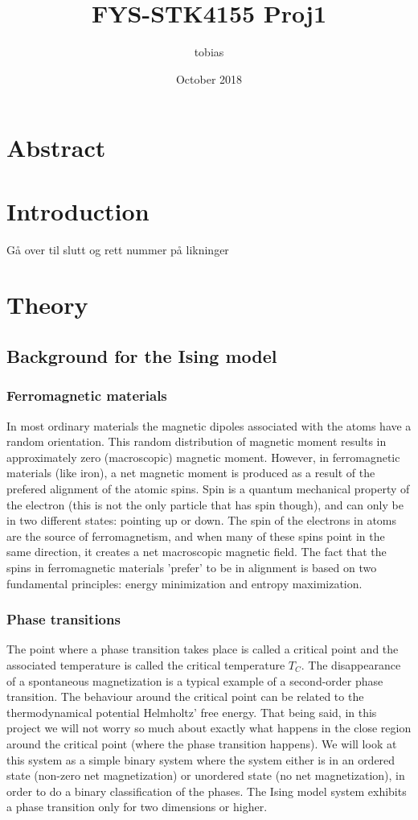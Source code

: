 \documentclass[a4paper,12pt]{article}
\title{FYS-STK4155 Proj1}
\author{tobias }
\date{October 2018}
\begin{document}
\maketitle

\section{Abstract}

\section{Introduction}
Gå over til slutt og rett nummer på likninger

\section{Theory}

\subsection{Background for the Ising model}

\subsubsection{Ferromagnetic materials}
In most ordinary materials the magnetic dipoles associated with the atoms have a random orientation. This random distribution of magnetic moment results in approximately zero (macroscopic) magnetic moment. However, in ferromagnetic materials (like iron), a net magnetic moment is produced as a result of the prefered alignment of the atomic spins.
Spin is a quantum mechanical property of the electron (this is not the only particle that has spin though), and can only be in two different states: pointing up or down. The spin of the electrons in atoms are the source of ferromagnetism, and when many of these spins point in the same direction, it creates a net macroscopic magnetic field.
The fact that the spins in ferromagnetic materials 'prefer' to be in alignment is based on two fundamental principles: energy minimization and entropy maximization.

\subsubsection{Phase transitions}
The point where a phase transition takes place is called a critical point and the associated temperature is called the critical temperature $T_C$. The disappearance of a spontaneous magnetization is a typical example of a second-order phase transition. The behaviour around the critical point can be related to the thermodynamical potential Helmholtz' free energy. That being said, in this project we will not worry so much about exactly what happens in the close region around the critical point (where the phase transition happens). We will look at this system as a simple binary system where the system either is in an ordered state (non-zero net magnetization) or unordered state (no net magnetization), in order to do a binary classification of the phases.\newline
The Ising model system exhibits a phase transition only for two dimensions or higher.
\end{document}

